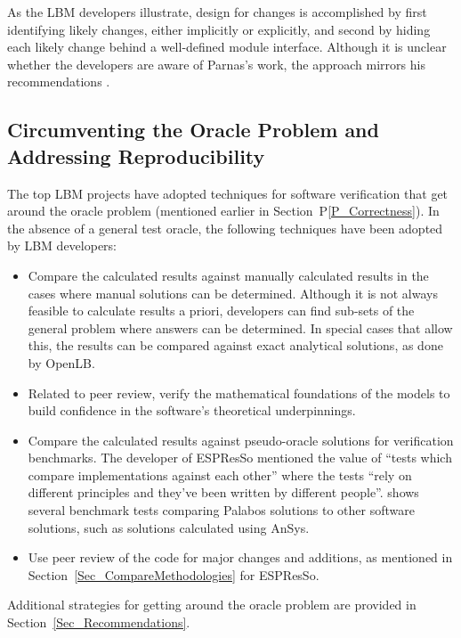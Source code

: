 \documentclass[final, 3p, times, authoryear]{elsarticle}
\newcommand{\ppref}[1]{P\ref{#1}}
\begin{document}
As the LBM developers illustrate, design for changes is accomplished by first
identifying likely changes, either implicitly or explicitly, and second by
hiding each likely change behind a well-defined module interface.  Although it
is unclear whether the developers are aware of Parnas's work, the approach
mirrors his recommendations \citep{Parnas1972a}.

\subsection{Circumventing the Oracle Problem and Addressing Reproducibility}
\label{SecReproducibility}

The top LBM projects have adopted techniques for software verification that get
around the oracle problem (mentioned earlier in Section~\ppref{P_Correctness}). In
the absence of a general test oracle, the following techniques have been adopted
by LBM developers:

\begin{itemize}
	\item Compare the calculated results against manually calculated results in
	the cases where manual solutions can be determined.  Although it is not
	always feasible to calculate results a priori, developers can find sub-sets
	of the general problem where answers can be determined.  In special cases
	that allow this, the results can be compared against exact analytical
	solutions, as done by OpenLB.
	\item Related to peer review, verify the mathematical foundations of the
	models to build confidence in the software's theoretical underpinnings.
	\item Compare the calculated results against pseudo-oracle solutions for
	verification benchmarks. The developer of ESPResSo mentioned the value of
	``tests which compare implementations against each other'' where the tests
	``rely on different principles and they've been written by different
	people''. \citet{latt2021palabos} shows several benchmark tests comparing
	Palabos solutions to other software solutions, such as solutions calculated
	using AnSys.
	\item Use peer review of the code for major changes and additions, as
	mentioned in Section~\ref{Sec_CompareMethodologies} for ESPResSo. 
\end{itemize}

\noindent Additional strategies for getting around the oracle problem are
provided in Section~\ref{Sec_Recommendations}.
\end{document}
